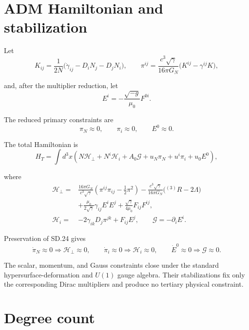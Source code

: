 \documentclass[10pt]{article}
\begin{document}
\section{ADM Hamiltonian and stabilization}

Let
\[
K_{ij}=\frac1{2N}\bigl(\dot\gamma_{ij}-D_iN_j-D_jN_i\bigr),
\qquad
\pi^{ij}=\frac{c^3\sqrt\gamma}{16\pi G_N}
\bigl(K^{ij}-\gamma^{ij}K\bigr),
\tag{SD.22}
\]
\par\noindent
and, after the multiplier reduction, let
\[
E^i=-\frac{\sqrt{-g}}{\mu_0}F^{0i}.
\tag{SD.23}
\]
\par\noindent
The reduced primary constraints are
\[
\pi_N\approx0,\qquad \pi_i\approx0,\qquad E^0\approx0.
\tag{SD.24}
\]
\par\noindent
The total Hamiltonian is
\[
H_T=\int d^3x\left(
N\mathcal H_\perp+N^i\mathcal H_i+A_0\mathcal G
+u_N\pi_N+u^i\pi_i+u_0E^0\right),
\tag{SD.25}
\]
\par\noindent
where
\[
\begin{aligned}
\mathcal H_\perp={}&
\frac{16\pi G_N}{c^3\sqrt\gamma}
\left(\pi^{ij}\pi_{ij}-\frac12\pi^2\right)
-\frac{c^3\sqrt\gamma}{16\pi G_N}\bigl({}^{(3)}R-2\Lambda\bigr)\\
&+\frac{\mu_0}{2\sqrt\gamma}\gamma_{ij}E^iE^j
+\frac{\sqrt\gamma}{4\mu_0}F_{ij}F^{ij},\\
\mathcal H_i={}&-2\gamma_{ik}D_j\pi^{jk}+F_{ij}E^j,
\qquad
\mathcal G=-\partial_iE^i.
\end{aligned}
\tag{SD.26}
\]
\par\noindent
Preservation of SD.24 gives
\[
\dot\pi_N\approx0\Longrightarrow\mathcal H_\perp\approx0,
\qquad
\dot\pi_i\approx0\Longrightarrow\mathcal H_i\approx0,
\qquad
\dot E^0\approx0\Longrightarrow\mathcal G\approx0.
\tag{SD.27}
\]
\par\noindent
The scalar, momentum, and Gauss constraints close under the standard
hypersurface-deformation and $U(1)$ gauge algebra. Their stabilizations fix
only the corresponding Dirac multipliers and produce no tertiary physical
constraint.

\section{Degree count}
\end{document}
